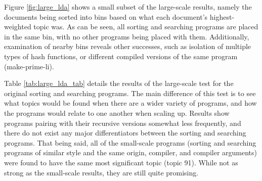Figure \ref{fig:large_lda} shows a small subset of the large-scale results, namely the documents being sorted into bins based on what each document's highest-weighted topic was. As can be seen, all sorting and searching programs are placed in the same bin, with no other programs being placed with them. Additionally, examination of nearby bins reveals other successes, such as isolation of multiple types of hash functions, or different compiled versions of the same program (make-prime-li).

Table \ref{tab:large_lda_tab} details the results of the large-scale test for the original sorting and searching programs. The main difference of this test is to see what topics would be found when there are a wider variety of programs, and how the programs would relate to one another when scaling up. Results show programs pairing with their recursive versions somewhat less frequently, and there do not exist any major differentiators between the sorting and searching programs. That being said, all of the small-scale programs (sorting and searching programs of similar style and the same origin, compiler, and compiler arguments) were found to have the same most significant topic (topic 91). While not as strong as the small-scale results, they are still quite promising.